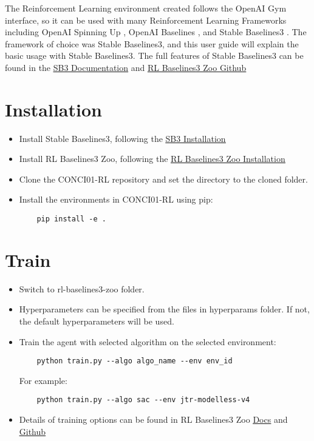 
The Reinforcement Learning environment created follows the OpenAI Gym interface, so it can be used with many Reinforcement Learning Frameworks including OpenAI Spinning Up \cite{SpinningUp2018}, OpenAI Baselines \cite{baselines}, and Stable Baselines3 \cite{stable-baselines3}. The framework of choice was Stable Baselines3, and this user guide will explain the basic usage with Stable Baselines3. The full features of Stable Baselines3 can be found in the \href{https://stable-baselines3.readthedocs.io/en/master/index.html}{\underline{SB3 Documentation}} and \href{https://github.com/DLR-RM/rl-baselines3-zoo}{\underline{RL Baselines3 Zoo Github}}

\section{Installation}

\begin{itemize}
    \item Install Stable Baselines3, following the \href{https://stable-baselines3.readthedocs.io/en/master/guide/install.html}{\underline{SB3 Installation}}
    \item Install RL Baselines3 Zoo, following the \href{https://stable-baselines3.readthedocs.io/en/master/guide/rl_zoo.html}{\underline{RL Baselines3 Zoo Installation}}
    \item Clone the CONCI01-RL repository and set the directory to the cloned folder.
    \item Install the environments in CONCI01-RL using pip:
    \begin{lstlisting}
    pip install -e .
    \end{lstlisting}
\end{itemize}

\section{Train}
\begin{itemize}
    \item Switch to rl-baselines3-zoo folder.
    \item Hyperparameters can be specified from the files in hyperparams folder. If not, the default hyperparameters will be used.
    \item Train the agent with selected algorithm on the selected environment:
    \begin{lstlisting}
    python train.py --algo algo_name --env env_id
    \end{lstlisting}
    For example:
        \begin{lstlisting}
    python train.py --algo sac --env jtr-modelless-v4
    \end{lstlisting}
    \item Details of training options can be found in RL Baselines3 Zoo \href{https://stable-baselines3.readthedocs.io/en/master/guide/rl_zoo.html}{\underline{Docs}} and \href{https://github.com/DLR-RM/rl-baselines3-zoo}{\underline{Github}}
\end{itemize}

